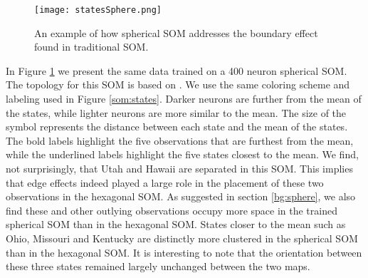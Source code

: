 \begin{figure}[htb]
\centering
\texttt{[image: statesSphere.png]}
\caption{An example of how spherical SOM addresses the boundary effect found in
traditional SOM.}
\label{sphere:states}
\end{figure}

In Figure \ref{sphere:states} we present the same data trained on a 400 neuron
spherical SOM.  The topology for this SOM is based on \cite{Rakhmanov94}.  We
use the same coloring scheme and labeling used in Figure \ref{som:states}.
Darker neurons are further from the mean of the states, while lighter neurons
are more similar to the mean.  The size of the symbol represents the distance
between each state and the mean of the states.  The bold labels highlight the
five observations that are furthest from the mean, while the underlined labels
highlight the five states closest to the mean.  We find, not surprisingly, that
Utah and Hawaii are separated in this SOM.  This implies that edge effects indeed
played a large role in the placement of these two observations in the hexagonal
SOM.  As suggested in section \ref{bg:sphere}, we also find these and other
outlying observations occupy more space in the trained spherical SOM than in
the hexagonal SOM.  States closer to the mean such as Ohio, Missouri and
Kentucky are distinctly more clustered in the spherical SOM than in
the hexagonal SOM.  It is interesting to note that the orientation between
these three states remained largely unchanged between the two maps.

